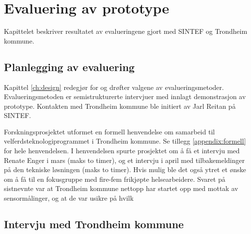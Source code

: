 \chapter{Evaluering av prototype}
\label{ch:evaluation1}
Kapittelet beskriver resultatet av evalueringene gjort med SINTEF og Trondheim kommune.

\section{Planlegging av evaluering}
Kapittel \ref{ch:design} redegjør for og drøfter valgene av evalueringsmetoder.
Evalueringsmetoden er semistrukturerte intervjuer med innlagt demonstrasjon av prototype.
Kontakten med Trondheim kommune ble initiert av Jarl Reitan på SINTEF.

Forskningsprosjektet utformet en formell henvendelse om samarbeid til velferdsteknologiprogrammet i Trondheim kommune.
Se tillegg \ref{appendix:formell} for hele henvendelsen. I henvendelsen spurte prosjektet om å få et intervju med Renate Enger i mars
(maks to timer), og et intervju i april med tilbakemeldinger på den tekniske løsningen (maks to timer). Hvis mulig ble det også
ytret et ønske om å få til en fokusgruppe med fire-fem frikjøpte helsearbeidere. Svaret på sistnevnte var at Trondheim kommune
nettopp har startet opp med mottak av sensormålinger, og at de var usikre på hvilk


\section{Intervju med Trondheim
kommune}\label{intervju-med-trondheim-kommune}


\def\tightlist{}

